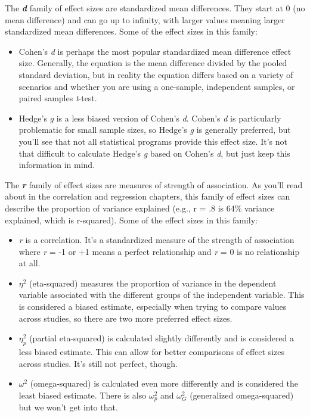 \documentclass[
]{book}
\begin{document}
The \textbf{\emph{d}} family of effect sizes are standardized mean differences. They start at 0 (no mean difference) and can go up to infinity, with larger values meaning larger standardized mean differences. Some of the effect sizes in this family:

\begin{itemize}
\item
  Cohen's \emph{d} is perhaps the most popular standardized mean difference effect size. Generally, the equation is the mean difference divided by the pooled standard deviation, but in reality the equation differs based on a variety of scenarios and whether you are using a one-sample, independent samples, or paired samples \emph{t}-test.
\item
  Hedge's \emph{g} is a less biased version of Cohen's \emph{d}. Cohen's \emph{d} is particularly problematic for small sample sizes, so Hedge's \emph{g} is generally preferred, but you'll see that not all statistical programs provide this effect size. It's not that difficult to calculate Hedge's \emph{g} based on Cohen's \emph{d}, but just keep this information in mind.
\end{itemize}

The \textbf{\emph{r}} family of effect sizes are measures of strength of association. As you'll read about in the correlation and regression chapters, this family of effect sizes can describe the proportion of variance explained (e.g., r = .8 is 64\% variance explained, which is r-squared). Some of the effect sizes in this family:

\begin{itemize}
\item
  \emph{r} is a correlation. It's a standardized measure of the strength of association where \emph{r} = -1 or +1 means a perfect relationship and \emph{r} = 0 is no relationship at all.
\item
  \(\eta^2\) (eta-squared) measures the proportion of variance in the dependent variable associated with the different groups of the independent variable. This is considered a biased estimate, especially when trying to compare values across studies, so there are two more preferred effect sizes.
\item
  \(\eta^2_p\) (partial eta-squared) is calculated slightly differently and is considered a less biased estimate. This can allow for better comparisons of effect sizes across studies. It's still not perfect, though.
\item
  \(\omega^2\) (omega-squared) is calculated even more differently and is considered the least biased estimate. There is also \(\omega^2_p\) and \(\omega^2_G\) (generalized omega-squared) but we won't get into that.
\end{itemize}
\end{document}
